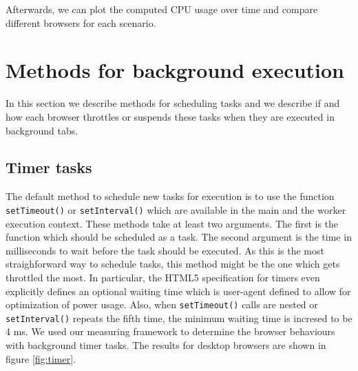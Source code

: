\documentclass[
	ruledheaders=section,%
	class=report,%
	thesis={type=bachelor},%
	accentcolor=9c,%
	custommargins=true,%
	marginpar=false,%
	parskip=half-,%
	fontsize=11pt,%
]{tudapub}
\begin{document}
  Afterwards, we can plot the computed CPU usage over time and compare different browsers for each scenario.

  \section{Methods for background execution}
  \label{chap:methods}

  In this section we describe methods for scheduling tasks and we describe if and how each browser throttles or suspends these tasks when they are executed in background tabs.
  
  \subsection{Timer tasks}
  \label{sec:timer-tasks}

  The default method to schedule new tasks for execution is to use the function \texttt{setTimeout()} or \texttt{setInterval()} which are available in the main and the worker execution context. These methods take at least two arguments. The first is the function which should be scheduled as a task. The second argument is the time in milliseconds to wait before the task should be executed. As this is the most straighforward way to schedule tasks, this method might be the one which gets throttled the most. In particular, the HTML5 specification for timers \cite{whatwg-timers} even explicitly defines an optional waiting time which is user-agent defined to allow for optimization of power usage. Also, when \texttt{setTimeout()} calls are nested or \texttt{setInterval()} repeats the fifth time, the minimum waiting time is incresed to be 4 ms. We used our measuring framework to determine the browser behaviours with background timer tasks. The results for desktop browsers are shown in figure \ref{fig:timer}.
\end{document}
